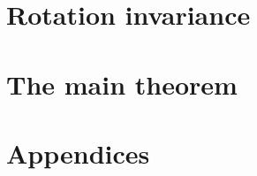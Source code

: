 \part*{Rotation invariance}







\part*{The main theorem}




\appendix
\part*{Appendices}














